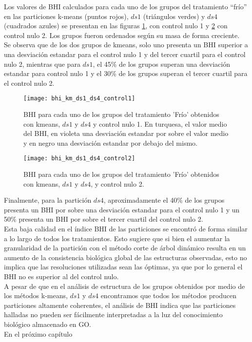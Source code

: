 Los valores de BHI calculados para cada uno de los grupos del tratamiento ``frío'' en las particiones k-means (puntos rojos), $ds1$ (triángulos verdes) y $ds4$ (cuadrados azules) se presentan en las figuras \ref{fig:bhi_km_ds1_ds4_control1}, con control nulo 1 y \ref{fig:bhi_km_ds1_ds4_control2} con control nulo 2. Los grupos fueron ordenados según su masa de forma creciente.\\
Se observa que de los dos grupos de kmeans, solo uno presenta un BHI superior a una desviación estandar para el control nulo 1 y del tercer cuartil para el control nulo 2, mientras que para $ds1$, el 45\% de los grupos superan una desviación estandar para control nulo 1 y el 30\% de los grupos superan el tercer cuartil para el control nulo 2.
\begin{figure*}[t!]
    \centering
    \begin{subfigure}[t]{0.8\textwidth}
    \centering
    \texttt{[image: bhi\_km\_ds1\_ds4\_control1]}
    \caption{BHI para cada uno de los grupos del tratamiento 'Frío' obtenidos con kmeans, $ds1$ y $ds4$ y control nulo 1. En turquesa, el valor medio del BHI, en violeta una desviación estandar por sobre el valor medio y en negro una desviación estandar por debajo del mismo.}
    \label{fig:bhi_km_ds1_ds4_control1}
    \end{subfigure}
    \begin{subfigure}[t]{0.8\textwidth}
    \centering
    \texttt{[image: bhi\_km\_ds1\_ds4\_control2]}
    \caption{BHI para cada uno de los grupos del tratamiento 'Frío' obtenidos con kmeans, $ds1$ y $ds4$, y control nulo 2.}
    \label{fig:bhi_km_ds1_ds4_control2}
    \end{subfigure}
    \caption{Índice de Homogeneidad Biológica, BHI, para cada uno de los grupos del tratamiento 'Frío' obtenidos con kmeans, $ds1$ y $ds4$ y controles nulos.}
\end{figure*}

Finalmente, para la partición $ds4$, aproximadamente el 40\% de los grupos presenta un BHI por sobre una desviación estandar para el control nulo 1 y un 50\% presenta un BHI por sobre el tercer cuartil del control nulo 2.\\ 
Esta baja calidad en el índice BHI de las particiones se encontró de forma similar a lo largo de todos los tratamientos. Esto sugiere que si bien el aumentar la granularidad de la partición con el método corte de árbol dinámico resulta en un aumento de la consistencia biológica global de las estructuras observadas, esto no implica que las resoluciones utilizadas sean las óptimas, ya que por lo general el BHI no es superior al del control nulo.\\
A pesar de que en el análisis de estructura de los grupos obtenidos por medio de los métodos k-means, $ds1$ y $ds4$ encontramos que todos los métodos producen particiones altamente coherentes, el análisis de BHI indica que las particiones halladas no pueden ser fácilmente interpretadas a la luz del conocimiento biológico almacenado en GO.\\
En el próximo capítulo 
